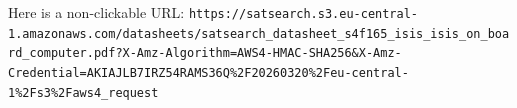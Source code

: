 \documentclass{article}
\begin{document}
Here is a non-clickable URL: \nolinkurl{https://satsearch.s3.eu-central-1.amazonaws.com/datasheets/satsearch_datasheet_s4f165_isis_isis_on_board_computer.pdf?X-Amz-Algorithm=AWS4-HMAC-SHA256&X-Amz-Credential=AKIAJLB7IRZ54RAMS36Q%2F20260320%2Feu-central-1%2Fs3%2Faws4_request}
\end{document}
